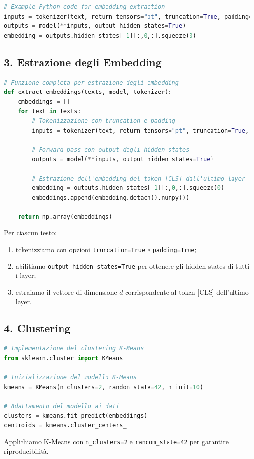 \documentclass[a4paper,11pt]{article}
\begin{document}
\begin{lstlisting}[language=Python]
# Example Python code for embedding extraction
inputs = tokenizer(text, return_tensors="pt", truncation=True, padding=True)
outputs = model(**inputs, output_hidden_states=True)
embedding = outputs.hidden_states[-1][:,0,:].squeeze(0)
\end{lstlisting}

\subsection*{3. Estrazione degli Embedding}
\begin{lstlisting}[language=Python]
# Funzione completa per estrazione degli embedding
def extract_embeddings(texts, model, tokenizer):
    embeddings = []
    for text in texts:
        # Tokenizzazione con truncation e padding
        inputs = tokenizer(text, return_tensors="pt", truncation=True, padding=True)
        
        # Forward pass con output degli hidden states
        outputs = model(**inputs, output_hidden_states=True)
        
        # Estrazione dell'embedding del token [CLS] dall'ultimo layer
        embedding = outputs.hidden_states[-1][:,0,:].squeeze(0)
        embeddings.append(embedding.detach().numpy())
    
    return np.array(embeddings)
\end{lstlisting}
Per ciascun testo:
\begin{enumerate}
  \item tokenizziamo con opzioni \texttt{truncation=True} e \texttt{padding=True};
  \item abilitiamo \texttt{output\_hidden\_states=True} per ottenere gli hidden states di tutti i layer;
  \item estraiamo il vettore di dimensione \( d \) corrispondente al token [CLS] dell'ultimo layer.
\end{enumerate}

\subsection*{4. Clustering}
\begin{lstlisting}[language=Python]
# Implementazione del clustering K-Means
from sklearn.cluster import KMeans

# Inizializzazione del modello K-Means
kmeans = KMeans(n_clusters=2, random_state=42, n_init=10)

# Adattamento del modello ai dati
clusters = kmeans.fit_predict(embeddings)
centroids = kmeans.cluster_centers_
\end{lstlisting}
Applichiamo K-Means con \texttt{n\_clusters=2} e \texttt{random\_state=42} per garantire riproducibilità.
\end{document}

